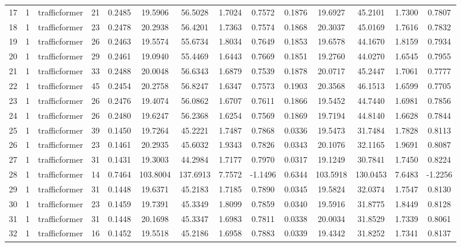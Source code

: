 \begin{landscape}
\begin{longtable}{c | c | c | c | c | c | c | c | c | c | c | c | c | c}
	17 & 1 & trafficformer & 21 & 0.2485 & 19.5906 & 56.5028 & 1.7024 & 0.7572 & 0.1876 & 19.6927 & 45.2101 & 1.7300 & 0.7807 \\
	18 & 1 & trafficformer & 23 & 0.2478 & 20.2938 & 56.4201 & 1.7363 & 0.7574 & 0.1868 & 20.3037 & 45.0169 & 1.7616 & 0.7832 \\
	19 & 1 & trafficformer & 26 & 0.2463 & 19.5574 & 55.6734 & 1.8034 & 0.7649 & 0.1853 & 19.6578 & 44.1670 & 1.8159 & 0.7934 \\
	20 & 1 & trafficformer & 29 & 0.2461 & 19.0940 & 55.4469 & 1.6443 & 0.7669 & 0.1851 & 19.2760 & 44.0270 & 1.6545 & 0.7955 \\
	21 & 1 & trafficformer & 33 & 0.2488 & 20.0048 & 56.6343 & 1.6879 & 0.7539 & 0.1878 & 20.0717 & 45.2447 & 1.7061 & 0.7777 \\
	22 & 1 & trafficformer & 45 & 0.2454 & 20.2758 & 56.8247 & 1.6347 & 0.7573 & 0.1903 & 20.3568 & 46.1513 & 1.6599 & 0.7705 \\
	23 & 1 & trafficformer & 26 & 0.2476 & 19.4074 & 56.0862 & 1.6707 & 0.7611 & 0.1866 & 19.5452 & 44.7440 & 1.6981 & 0.7856 \\
	24 & 1 & trafficformer & 26 & 0.2480 & 19.6247 & 56.2368 & 1.6254 & 0.7569 & 0.1869 & 19.7194 & 44.8140 & 1.6628 & 0.7844 \\
	25 & 1 & trafficformer & 39 & 0.1450 & 19.7264 & 45.2221 & 1.7487 & 0.7868 & 0.0336 & 19.5473 & 31.7484 & 1.7828 & 0.8113 \\
	26 & 1 & trafficformer & 23 & 0.1461 & 20.2935 & 45.6032 & 1.9343 & 0.7826 & 0.0343 & 20.1076 & 32.1165 & 1.9691 & 0.8087 \\
	27 & 1 & trafficformer & 31 & 0.1431 & 19.3003 & 44.2984 & 1.7177 & 0.7970 & 0.0317 & 19.1249 & 30.7841 & 1.7450 & 0.8224 \\
	28 & 1 & trafficformer & 14 & 0.7464 & 103.8004 & 137.6913 & 7.7572 & -1.1496 & 0.6344 & 103.5918 & 130.0453 & 7.6483 & -1.2256 \\
	29 & 1 & trafficformer & 31 & 0.1448 & 19.6371 & 45.2183 & 1.7185 & 0.7890 & 0.0345 & 19.5824 & 32.0374 & 1.7547 & 0.8130 \\
	30 & 1 & trafficformer & 23 & 0.1459 & 19.7391 & 45.3349 & 1.8099 & 0.7859 & 0.0340 & 19.5916 & 31.8775 & 1.8449 & 0.8128 \\
	31 & 1 & trafficformer & 31 & 0.1448 & 20.1698 & 45.3347 & 1.6983 & 0.7811 & 0.0338 & 20.0034 & 31.8529 & 1.7339 & 0.8061 \\
	32 & 1 & trafficformer & 16 & 0.1452 & 19.5518 & 45.2186 & 1.6958 & 0.7883 & 0.0339 & 19.4342 & 31.8252 & 1.7341 & 0.8137 \\

\end{longtable}
\end{landscape}
